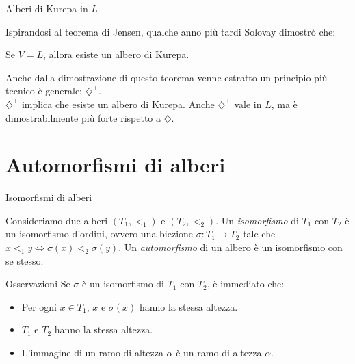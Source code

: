 \documentclass{beamer}
\theoremstyle{num.custom-title}
\theoremstyle{custom-title}
\renewcommand{\iff}{\Leftrightarrow}
\begin{document}
\begin{frame}{Alberi di Kurepa in $L$}

Ispirandosi al teorema di Jensen, qualche anno più tardi Solovay dimostrò che:

\begin{theorem}[Solovay, 1971]
Se $V=L$, allora esiste un albero di Kurepa.
\end{theorem}

\pause

Anche dalla dimostrazione di questo teorema venne estratto un principio più tecnico è generale: $\diamondsuit^+$.\\
\pause
$\diamondsuit^+$ implica che esiste un albero di Kurepa. Anche $\diamondsuit^+$ vale in $L$, ma è dimostrabilmente più forte rispetto a $\diamondsuit$.

\end{frame}


\section{Automorfismi di alberi}

\begin{frame}{Isomorfismi di alberi}

\begin{definition}
Consideriamo due alberi $(T_1,<_1)$ e $(T_2,<_2)$. Un \emph{isomorfismo} di $T_1$ con $T_2$ è un isomorfismo d'ordini, ovvero una biezione $\sigma \colon T_1 \to T_2$ tale che $x <_1 y \iff \sigma(x) <_2 \sigma(y)$. Un \emph{automorfismo} di un albero è un isomorfismo con se stesso.
\end{definition}

\pause

\begin{block}{Osservazioni}
Se $\sigma$ è un isomorfismo di $T_1$ con $T_2$, è immediato che:
\begin{itemize}
\item Per ogni $x \in T_1$, $x$ e $\sigma(x)$ hanno la stessa altezza.
\item $T_1$ e $T_2$ hanno la stessa altezza.
\item L'immagine di un ramo di altezza $\alpha$ è un ramo di altezza $\alpha$.
\end{itemize}
\end{block}

\end{frame}
\end{document}
